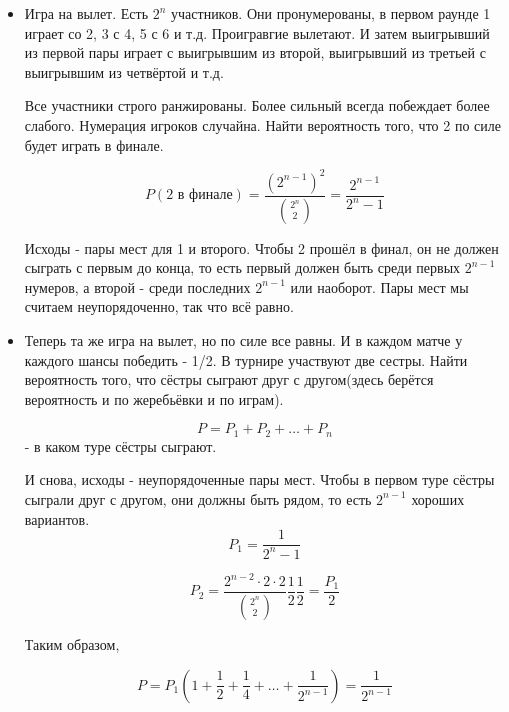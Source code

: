 \begin{itemize}
	\item Игра на вылет. Есть $2^n$ участников. Они пронумерованы, в первом раунде 1 играет со 2, 3 с 4, 5 с 6 и т.д. Проигравгие вылетают. И затем выигрывший из первой пары играет с выигрывшим из второй, выигрывший из третьей с выигрывшим из четвёртой и т.д. 
	
	Все участники строго ранжированы. Более сильный всегда побеждает более слабого. Нумерация игроков случайна. Найти вероятность того, что 2 по силе будет играть в финале.
	
	\[P(\text{2 в финале}) = \frac{(2^{n - 1})^2}{\binom{2^n}{2}} = \frac{2^{n - 1}}{2^n - 1}\]
	
	Исходы - пары мест для 1 и второго. Чтобы 2 прошёл в финал, он не должен сыграть с первым до конца, то есть первый должен быть среди первых $2^{n - 1}$ нумеров, а второй - среди последних $2^{n - 1}$ или наоборот. Пары мест мы считаем неупорядоченно, так что всё равно.
	\item Теперь та же игра на вылет, но по силе все равны. И в каждом матче у каждого шансы победить - 1/2. В турнире участвуют две сестры. Найти вероятность того, что сёстры сыграют друг с другом(здесь берётся вероятность и по жеребьёвки и по играм).
	
	\[P = P_1 + P_2 + \dots + P_n\] - в каком туре сёстры сыграют.
	
	И снова, исходы - неупорядоченные пары мест. Чтобы в первом туре сёстры сыграли друг с другом, они должны быть рядом, то есть $2^{n - 1}$ хороших вариантов.
	\[P_1 = \frac{1}{2^n - 1} \]
	
	\[P_2 = \frac{2^{n - 2} \cdot 2 \cdot 2}{\binom{2^n}{2}}\frac{1}{2}\frac{1}{2} = \frac{P_1}{2} \]
	
	Таким образом, 
	
	\[P = P_1(1 + \frac{1}{2} + \frac{1}{4} + \dots + \frac{1}{2^{n - 1}}) = \frac{1}{2^{n - 1}}\]
\end{itemize}

